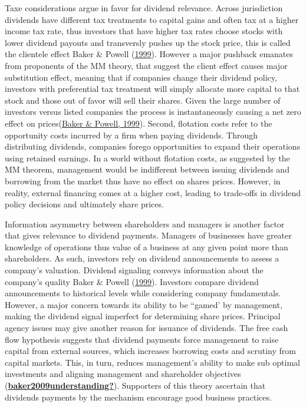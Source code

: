 \documentclass[12pt,preprint, authoryear]{elsarticle}
\numberwithin{equation}{section}
\numberwithin{figure}{section}
\numberwithin{table}{section}
\begin{document}
Taxe considerations argue in favor for dividend relevance. Across
jurisdiction dividends have different tax treatments to capital gains
and often tax at a higher income tax rate, thus investors that have
higher tax rates choose stocks with lower dividend payouts and
transversly pushes up the stock price, this is called the clientele
effect Baker \& Powell
(\protect\hyperlink{ref-baker1999corporate}{1999}). However a major
pushback emanates from proponents of the MM theory, that suggest the
client effect causes major substitution effect, meaning that if
companies change their dividend policy, investors with preferential tax
treatment will simply allocate more capital to that stock and those out
of favor will sell their shares. Given the large number of investors
versus listed companies the process is instantaneously causing a net
zero effect on prices(\protect\hyperlink{ref-baker1999corporate}{Baker
\& Powell, 1999}). Second, flotation costs refer to the opportunity
costs incurred by a firm when paying dividends. Through distributing
dividends, companies forego opportunities to expand their operations
using retained earnings. In a world without flotation costs, as
suggested by the MM theorem, management would be indifferent between
issuing dividends and borrowing from the market thus have no effect on
shares prices. However, in reality, external financing comes at a higher
cost, leading to trade-offs in dividend policy decisions and ultimately
share prices.

Information asymmetry between shareholders and managers is another
factor that gives relevance to dividend payments. Managers of businesses
have greater knowledge of operations thus value of a business at any
given point more than shareholders. As such, investors rely on dividend
announcements to assess a company's valuation. Dividend signaling
conveys information about the company's quality Baker \& Powell
(\protect\hyperlink{ref-baker1999corporate}{1999}). Investors compare
dividend announcements to historical levels while considering company
fundamentals. However, a major concern towards its ability to be
``gamed' by management, making the dividend signal imperfect for
determining share prices. Principal agency issues may give another
reason for issuance of dividends. The free cash flow hypothesis suggests
that dividend payments force management to raise capital from external
sources, which increases borrowing costs and scrutiny from capital
markets. This, in turn, reduces management's ability to make sub optimal
investments and aligning management and shareholder objectives
(\protect\hyperlink{ref-baker2009understanding}{\textbf{baker2009understanding?}}).
Supporters of this theory ascertain that dividends payments by the
mechanism encourage good business practices.
\end{document}
